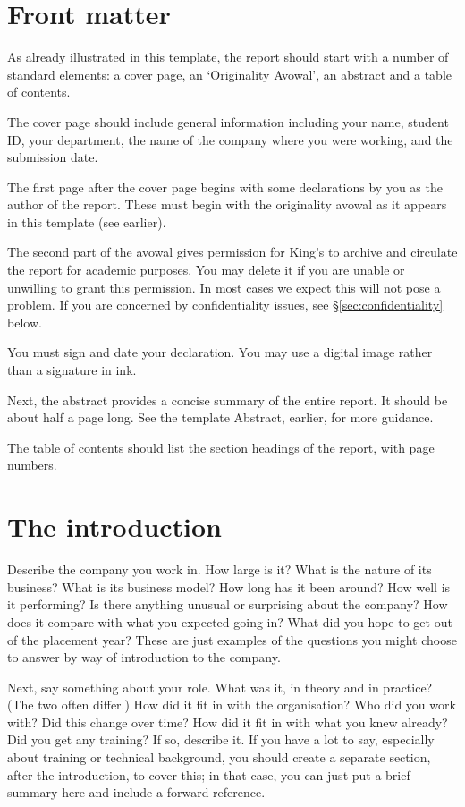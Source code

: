 \documentclass[british,12pt,a4paper]{report}
\begin{document}
\section{Front matter}

As already illustrated in this template, the report should start with a number of standard elements:
a cover page, an `Originality Avowal', an abstract and a table of contents.

The cover page should include general information including your name, student ID, your department,
the name of the company where you were working, and the submission date.

The first page after the cover page begins with some declarations by you as the author of the
report. These must begin with the originality avowal as it appears in this template (see earlier).

The second part of the avowal gives permission for King's to archive and circulate the report for
academic purposes.
You may delete it if you are unable or unwilling to grant this permission.
In most cases we expect this will not pose a problem.
If you are concerned by confidentiality issues, see \S\ref{sec:confidentiality} below.

You must sign and date your declaration. You may use a digital image rather than a signature in ink.

Next, the abstract provides a concise summary of the entire report.
It should be about half a page long. See the template Abstract, earlier, for more guidance.

The table of contents should list the section headings of the report, with page numbers.

\section{The introduction}

Describe the company you work in.
How large is it?
What is the nature of its business?
What is its business model?
How long has it been around?
How well is it performing?
Is there anything unusual or surprising about the company?
How does it compare with what you expected going in?
What did you hope to get out of the placement year?
These are just examples of the questions you might choose to answer by way of introduction
to the company.

Next, say something about your role.
What was it, in theory and in practice? (The two often differ.)
How did it fit in with the organisation?
Who did you work with? Did this change over time?
How did it fit in with what you knew already?
Did you get any training?
If so, describe it.
If you have a lot to say, especially about training or technical background,
you should create a separate section, after the introduction, to cover this;
in that case, you can just put a brief summary here and include a forward reference.
\end{document}
